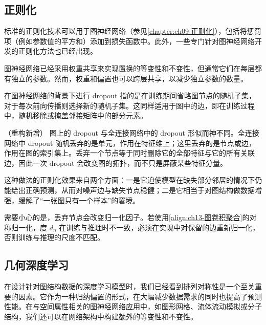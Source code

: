 \documentclass[../../main.tex]{subfiles}
\begin{document}
\subsection{正则化}\label{subsection:ch13-正则化}

标准的正则化技术可以用于图神经网络（参见\cref{chapter:ch09-正则化}），包括将惩罚项（例如参数值的平方和）添加到损失函数中。此外，一些专门针对图神经网络开发的正则化方法也已经出现。

图神经网络已经采用权重共享来实现置换的等变性和不变性，但通常它们在每层都有独立的参数。然而，权重和偏置也可以跨层共享，以减少独立参数的数量。

\begin{definition}\label{definition:ch13-图dropout}
在图神经网络的背景下进行 dropout 指的是在训练期间省略图节点的随机子集，对于每次前向传播则选择新的随机子集。这同样适用于图中的边，即在训练过程中，随机移除或掩盖邻接矩阵中的部分元素。
\end{definition}

\begin{remark}（重构新增）
图上的 dropout 与全连接网络中的 dropout 形似而神不同。全连接网络中 dropout 随机丢弃的是单元，作用在特征维上；这里丢弃的是节点或边，作用在图的索引集上。丢弃一个节点等于同时删除它的全部特征与它的所有关联边，因此一次 dropout 会改变图的拓扑，而不只是屏蔽某些特征分量。\par
这种做法的正则化效果来自两个方面：一是它迫使模型在缺失部分邻居的情况下仍能给出正确预测，从而对噪声边与缺失节点稳健；二是它相当于对图结构做数据增强，缓解了“一张图只有一个样本”的窘境。\par
需要小心的是，丢弃节点会改变归一化因子。若使用\eqref{align:ch13-图卷积聚合}的对称归一化，度 $d_n$ 在训练与推理时不一致，必须在实现中对保留的边重新归一化，否则训练与推理的尺度不匹配。
\end{remark}

\subsection{几何深度学习}\label{subsection:ch13-几何深度学习}

在设计针对图结构数据的深度学习模型时，我们已经看到排列对称性是一个至关重要的因素。它作为一种归纳偏置的形式，在大幅减少数据需求的同时也提高了预测性能。在与空间属性相关的图神经网络应用中，如图形网格、流体流动模拟或分子结构，我们还可以在网络架构中构建额外的等变性和不变性。
\end{document}
